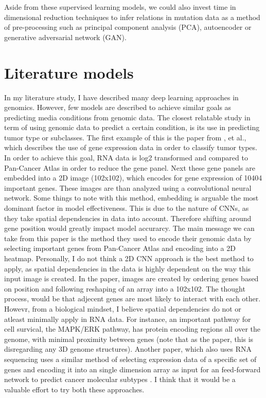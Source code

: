 \documentclass[11pt,]{article}
\begin{document}
Aside from these supervised learning models, we could also invest time
in dimensional reduction techniques to infer relations in mutation data
as a method of pre-processing such as principal component analysis
(PCA), autoencoder or generative adversarial network (GAN).

\hypertarget{literature-models}{%
\section{Literature models}\label{literature-models}}

In my literature study, I have described many deep learning approaches
in genomics. However, few models are described to achieve similar goals
as predicting media conditions from genomic data. The closest relatable
study in term of using genomic data to predict a certain condition, is
its use in predicting tumor type or subclasses. The first example of
this is the paper from \citet{Lyu2018}, et al., which describes the use
of gene expression data in order to classify tumor types. In order to
achieve this goal, RNA data is log2 transformed and compared to
Pan-Cancer Atlas in order to reduce the gene panel. Next these gene
panels are embedded into a 2D image (102x102), which encodes for gene
expression of 10404 important genes. These images are than analyzed
using a convolutional neural network. Some things to note with this
method, embedding is arguable the most dominant factor in model
effectiveness. This is due to the nature of CNNs, as they take spatial
dependencies in data into account. Therefore shifting around gene
position would greatly impact model accurarcy. The main message we can
take from this paper is the method they used to encode their genomic
data by selecting important genes from Pan-Cancer Atlas and encoding
into a 2D heatmap. Personally, I do not think a 2D CNN approach is the
best method to apply, as spatial dependencies in the data is highly
dependent on the way this input image is created. In the paper, images
are created by ordering genes based on position and following reshaping
of an array into a 102x102. The thought process, would be that adjecent
genes are most likely to interact with each other. Howevr, from a
biological mindset, I believe spatial dependencies do not or atleast
minimally apply in RNA data. For instance, an important pathway for cell
survical, the MAPK/ERK pathway, has protein encoding regions all over
the genome, with minimal proximity between genes (note that as the
paper, this is disregarding any 3D genome structures). Another paper,
which also uses RNA sequencing uses a similar method of selecting
expression data of a specific set of genes and encoding it into an
single dimension array as input for an feed-forward network to predict
cancer molecular subtypes \citep{Gao2019}. I think that it would be a
valuable effort to try both these approaches.
\end{document}
